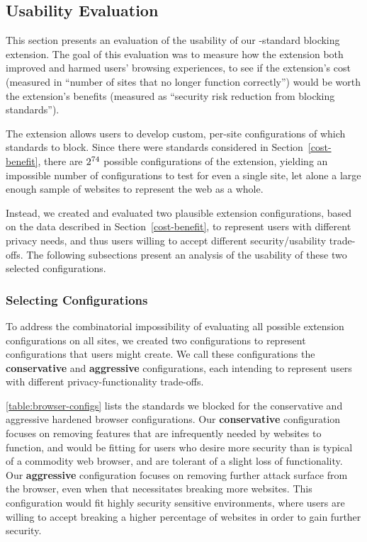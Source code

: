 \subsection{Usability Evaluation}
This section presents an evaluation of the usability of our \WAPI-standard
blocking extension.  The goal of this evaluation was to measure how the
extension both improved and harmed users' browsing experiences, to see if the
extension's cost (measured in ``number of sites that no longer function
correctly'') would be worth the extension's benefits (measured as ``security
risk reduction from blocking \WAPI standards'').

The extension allows users to develop custom, per-site configurations of which
\WAPI standards to block.  Since there were \NumStandards standards considered
in Section~\ref{cost-benefit}, there are \(2^{74}\) possible
configurations of the extension, yielding an impossible number of
configurations to test for even a single site, let alone a large enough sample
of websites to represent the web as a whole.

Instead, we created and evaluated two plausible extension configurations, based
on the data described in Section~\ref{cost-benefit}, to represent users with
different privacy needs, and thus users willing to accept different
security/usability trade-offs.  The following subsections present an analysis
of the usability of these two selected configurations.


\subsubsection{Selecting Configurations}
\label{current-web:extension:configurations}

To address the combinatorial impossibility of evaluating all possible extension
configurations on all sites, we created two configurations to represent
configurations that users might create.  We call these configurations the
\textbf{conservative} and \textbf{aggressive} configurations, each intending to
represent users with different privacy-functionality trade-offs.

\ref{table:browser-configs} lists the standards we blocked for the conservative
and aggressive hardened browser configurations.  Our \textbf{conservative}
configuration focuses on removing features that are infrequently needed by
websites to function, and would be fitting for users who desire more security
than is typical of a commodity web browser, and are tolerant of a slight loss
of functionality.  Our \textbf{aggressive} configuration focuses on removing
further attack surface from the browser, even when that necessitates breaking
more websites.  This configuration would fit highly security sensitive
environments, where users are willing to accept breaking a higher percentage of
websites in order to gain further security.

